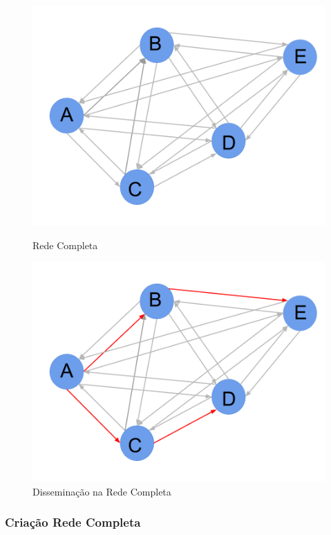 \documentclass[a4paper,12pt]{article}
\begin{document}
\begin{figure}[ht]
\centering
\begin{minipage}{.5\textwidth}
  \centering
  \includegraphics[width=.9\linewidth]{./rede3.png}
  \caption{Rede Completa}
  \label{fig:test1}
\end{minipage}%
\begin{minipage}{.5\textwidth}
  \centering
  \includegraphics[width=.9\linewidth]{./rede4.png}
  \caption{Disseminação na Rede Completa}
  \label{fig:test2}
\end{minipage}
\end{figure}


\pagebreak
\subsubsection{Criação Rede Completa}
\end{document}
